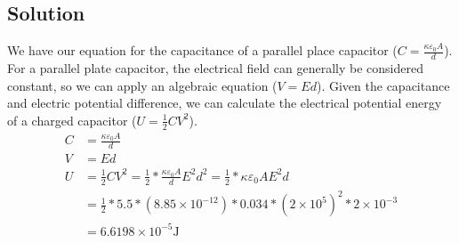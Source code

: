 \documentclass[12pt]{article}
\begin{document}
\subsection*{Solution}
We have our equation for the capacitance of a parallel place capacitor ($C = \frac{\kappa\varepsilon_0A}{d}$).
For a parallel plate capacitor, the electrical field can generally be considered constant, so we can apply an algebraic equation ($V = Ed$).
Given the capacitance and electric potential difference, we can calculate the electrical potential energy of a charged capacitor ($U = \frac{1}{2}CV^2$).
\begin{align*}
    C   &=  \frac{\kappa\varepsilon_0A}{d}\\
    V   &=  Ed\\
    U   &=  \frac{1}{2}CV^2
        =   \frac{1}{2}*\frac{\kappa\varepsilon_0 A}{d} E^2 d^2
        =   \frac{1}{2}*\kappa\varepsilon_0 A E^2 d\\
        &=  \frac{1}{2} * 5.5 * (8.85 \times 10^{-12}) * 0.034 * \left(2 \times 10^5\right)^2 * 2 \times 10^{-3}\\
        &=  \boxed{6.6198 \times 10^{-5} \unit{\joule}}
\end{align*}
\end{document}
